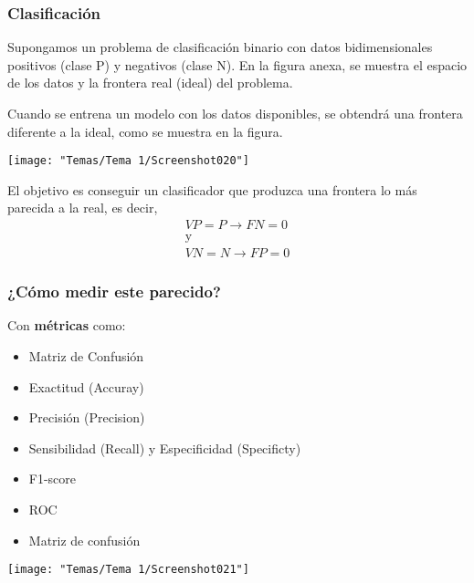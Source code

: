 \subsubsection{Clasificación}
\begin{minipage}{0.5\textwidth}
	Supongamos un problema de clasificación binario con datos bidimensionales positivos (clase P) y negativos (clase N). En la figura anexa, se muestra el espacio de los datos y la frontera real (ideal) del problema.
	
	\hspace{2cm}
	
	Cuando se entrena un modelo con los datos disponibles, se obtendrá una frontera diferente a la ideal, como se muestra en la figura.
\end{minipage}\qquad
\begin{minipage}{0.45\textwidth}
	\begin{center}
		\texttt{[image: "Temas/Tema 1/Screenshot020"]}
	\end{center}
\end{minipage}


El objetivo es conseguir un clasificador que produzca una frontera lo más parecida a la real, es decir, \[ \begin{array}{c}
	VP = P\longrightarrow FN=0\\
	\mathrm{y}\\
	VN=N\longrightarrow FP=0
\end{array} \]

\subsubsection*{¿Cómo medir este parecido?}
Con \textbf{métricas} como:
\begin{itemize}
	\item Matriz de Confusión
	\item Exactitud (Accuray)
	\item Precisión (Precision)
	\item Sensibilidad (Recall) y Especificidad (Specificty)
	\item F1-score
	\item ROC
\end{itemize}

\begin{itemize}[label=\color{red}\textbullet, leftmargin=*]
	\item \color{lightblue}Matriz de confusión
\end{itemize}
\begin{center}
	\texttt{[image: "Temas/Tema 1/Screenshot021"]}
\end{center}